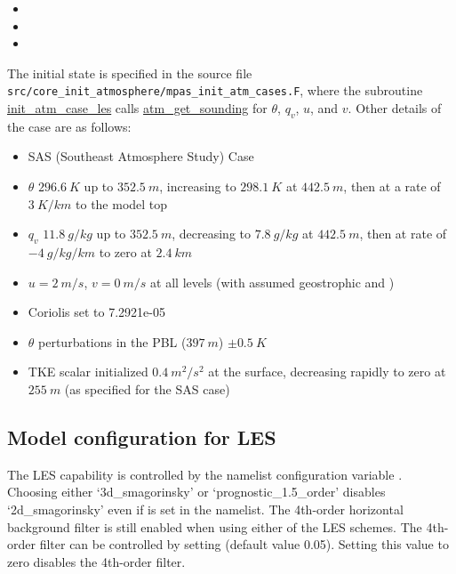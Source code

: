 \begin{itemize}
\item {}
\item {}
\item {}
\end{itemize}

The initial state is specified in the source file {\tt src/core\_init\_atmosphere/mpas\_init\_atm\_cases.F}, where
the subroutine \href{https://github.com/MPAS-Dev/MPAS-Model/blob/v8.4.0/src/core_init_atmosphere/mpas_init_atm_cases.F#L6222-L6225}{init\_atm\_case\_les} calls \href{https://github.com/MPAS-Dev/MPAS-Model/blob/v8.4.0/src/core_init_atmosphere/mpas_init_atm_cases.F#L6799}{atm\_get\_sounding} for $\theta$, $q_v$, $u$, and $v$. Other details of the case are as follows:

\begin{itemize}
\item SAS (Southeast Atmosphere Study) Case
\item $\theta$ $296.6~K$ up to $352.5~m$, increasing to $298.1~K$ at $442.5~m$, then at a rate of $3~K/km$ to the model top
\item $q_v$ $11.8~g/kg$ up to $352.5~m$, decreasing to $7.8~g/kg$ at $442.5~m$, then at rate of $-4~g/kg/km$ to zero at $2.4~km$
\item $u = 2~m/s$, $v = 0~m/s$ at all levels (with assumed geostrophic  and )
\item Coriolis set to 7.2921e-05
\item $\theta$ perturbations in the PBL ($397~m$) $\pm 0.5~K$
\item TKE scalar initialized $0.4~m^2 / s^2$ at the surface, decreasing rapidly to zero at $255~m$ (as specified for the SAS case)
\end{itemize}

\subsection{Model configuration for LES}
\label{sec:les_configuration}

The LES capability is controlled by the namelist configuration variable .
Choosing either `3d\_smagorinsky' or `prognostic\_1.5\_order' disables `2d\_smagorinsky' even if  is set in the namelist.
The 4th-order horizontal background filter is still enabled when using either of the LES schemes. The 4th-order filter can be controlled by setting  (default value 0.05). Setting this value to zero disables the 4th-order filter.

